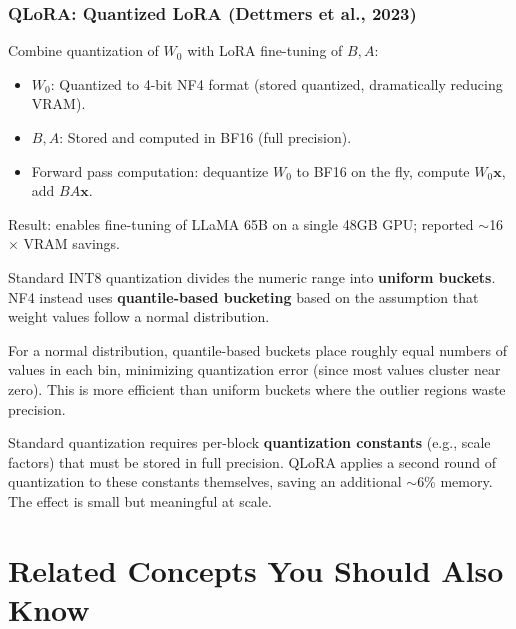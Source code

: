\documentclass[11pt, a4paper]{article}
\begin{document}
\subsubsection{QLoRA: Quantized LoRA (Dettmers et al., 2023)}

\begin{defbox}[QLoRA]
Combine quantization of $W_0$ with LoRA fine-tuning of $B, A$:
\begin{itemize}[leftmargin=1.5em]
  \item $W_0$: Quantized to 4-bit NF4 format (stored quantized, dramatically reducing VRAM).
  \item $B, A$: Stored and computed in BF16 (full precision).
  \item Forward pass computation: dequantize $W_0$ to BF16 on the fly, compute $W_0\mathbf{x}$, add $BA\mathbf{x}$.
\end{itemize}
Result: enables fine-tuning of LLaMA 65B on a single 48GB GPU; reported $\sim$16$\times$ VRAM savings.
\end{defbox}

\begin{defbox}
Standard INT8 quantization divides the numeric range into \textbf{uniform buckets}. NF4 instead uses \textbf{quantile-based bucketing} based on the assumption that weight values follow a normal distribution.

For a normal distribution, quantile-based buckets place roughly equal numbers of values in each bin, minimizing quantization error (since most values cluster near zero). This is more efficient than uniform buckets where the outlier regions waste precision.
\end{defbox}

\begin{defbox}
Standard quantization requires per-block \textbf{quantization constants} (e.g., scale factors) that must be stored in full precision. QLoRA applies a second round of quantization to these constants themselves, saving an additional $\sim$6\% memory. The effect is small but meaningful at scale.
\end{defbox}

\newpage
\section{Related Concepts You Should Also Know}
\end{document}
